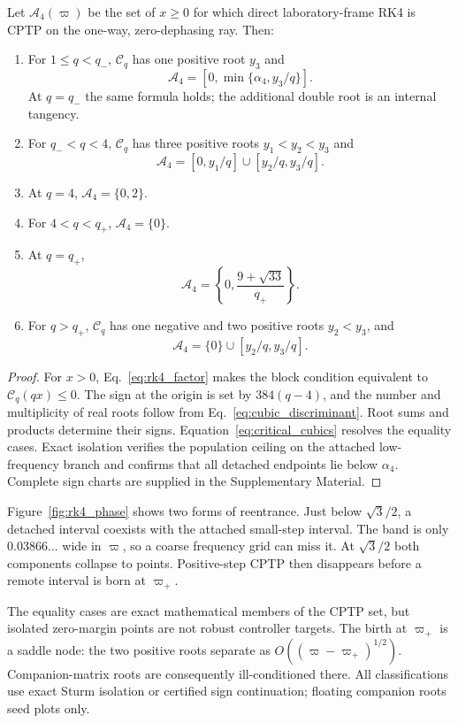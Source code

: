\begin{theorem}
\label{thm:rk4topology}
Let $\mathcal A_4(\varpi)$ be the set of $x\ge0$ for which direct laboratory-frame RK4 is CPTP on the one-way, zero-dephasing ray. Then:
\begin{enumerate}
 \item For $1\le q<q_-$, $\mathcal C_q$ has one positive root $y_3$ and
 \[
  \mathcal A_4=[0,\min\{\alpha_4,y_3/q\}].
 \]
 At $q=q_-$ the same formula holds; the additional double root is an internal tangency.
 \item For $q_-<q<4$, $\mathcal C_q$ has three positive roots $y_1<y_2<y_3$ and
 \[
  \mathcal A_4=[0,y_1/q]\cup[y_2/q,y_3/q].
 \]
 \item At $q=4$, $\mathcal A_4=\{0,2\}$.
 \item For $4<q<q_+$, $\mathcal A_4=\{0\}$.
 \item At $q=q_+$,
 \[
  \mathcal A_4=\left\{0,\frac{9+\sqrt{33}}{q_+}\right\}.
 \]
 \item For $q>q_+$, $\mathcal C_q$ has one negative and two positive roots $y_2<y_3$, and
 \[
  \mathcal A_4=\{0\}\cup[y_2/q,y_3/q].
 \]
\end{enumerate}
\end{theorem}

\begin{proof}
For $x>0$, Eq.~\eqref{eq:rk4_factor} makes the block condition equivalent to $\mathcal C_q(qx)\le0$. The sign at the origin is set by $384(q-4)$, and the number and multiplicity of real roots follow from Eq.~\eqref{eq:cubic_discriminant}. Root sums and products determine their signs. Equation~\eqref{eq:critical_cubics} resolves the equality cases. Exact isolation verifies the population ceiling on the attached low-frequency branch and confirms that all detached endpoints lie below $\alpha_4$. Complete sign charts are supplied in the Supplementary Material.
\end{proof}

Figure~\ref{fig:rk4_phase} shows two forms of reentrance. Just below $\sqrt3/2$, a detached interval coexists with the attached small-step interval. The band is only $0.03866\ldots$ wide in $\varpi$, so a coarse frequency grid can miss it. At $\sqrt3/2$ both components collapse to points. Positive-step CPTP then disappears before a remote interval is born at $\varpi_+$.

The equality cases are exact mathematical members of the CPTP set, but isolated zero-margin points are not robust controller targets. The birth at $\varpi_+$ is a saddle node: the two positive roots separate as $O((\varpi-\varpi_+)^{1/2})$. Companion-matrix roots are consequently ill-conditioned there. All classifications use exact Sturm isolation or certified sign continuation; floating companion roots seed plots only.

